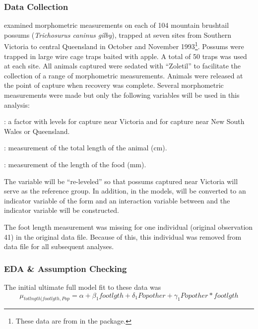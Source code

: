 \documentclass[10pt,openany]{book}\usepackage[]{graphicx}\usepackage[]{color}
\begin{document}
\subsubsection*{Data Collection}
\cite{Lindenmayeretal1995} examined morphometric measurements on each of 104 mountain brushtail possums (\emph{Trichosurus caninus gilby}), trapped at seven sites from Southern Victoria to central Queensland in October and November 1993\footnote{These data are from  in the  package.}.  Possums were trapped in large wire cage traps baited with apple.  A total of 50 traps was used at each site.  All animals captured were sedated with ``Zoletil'' to facilitate the collection of a range of morphometric measurements.  Animals were released at the point of capture when recovery was complete.  Several morphometric measurements were made but only the following variables will be used in this analysis:
\begin{Itemize}
  \item {}: a factor with levels  for capture near Victoria and  for capture near New South Wales or Queensland.
  \item {}: measurement of the total length of the animal (cm).
  \item {}: measurement of the length of the food (mm).
\end{Itemize}
The  variable will be ``re-leveled'' so that possums captured near Victoria will serve as the reference group.  In addition, in the models,  will be converted to an indicator variable of the form  and an interaction variable between  and the indicator variable will be constructed.

The foot length measurement was missing for one individual (original observation 41) in the original data file.  Because of this, this individual was removed from data file for all subsequent analyses.

\subsubsection*{EDA \& Assumption Checking}

The initial ultimate full model fit to these data was
\[ \mu_{totlngth|footlgth,Pop} = \alpha + \beta_{1}footlgth + \delta_{1}Popother + \gamma_{1}Popother*footlgth  \]
\end{document}
